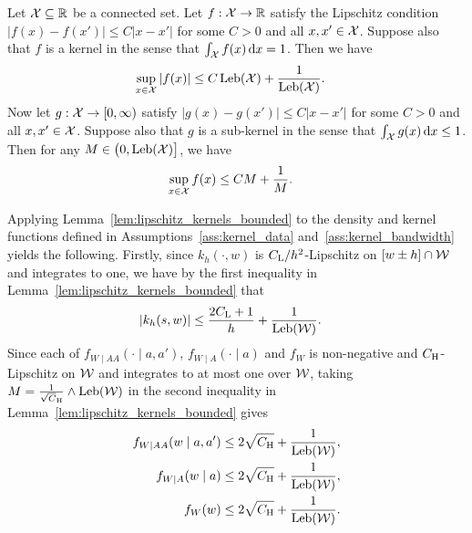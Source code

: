 \begin{lemma}
  \label{lem:lipschitz_kernels_bounded}

  Let $\mathcal{X} \subseteq \mathbb{R}$ be a connected set.
  Let $f: \mathcal{X} \to \mathbb{R}$ satisfy the Lipschitz condition
  $|f(x) - f(x')| \leq C |x-x'|$ for some $C > 0$
  and all $x, x' \in \mathcal{X}$.
  Suppose also that $f$ is a kernel in the sense that
  $\int_{\mathcal{X}} f(x) \,\mathrm{d}x = 1$.
  Then we have
  \begin{align*}
    \sup_{x \in \mathcal{X}} |f(x)|
    &\leq
    C \operatorname{Leb}(\mathcal{X}) + \frac{1}{\operatorname{Leb}(\mathcal{X})}.
  \end{align*}
  Now let $g: \mathcal{X} \to [0,\infty)$ satisfy
  $|g(x) - g(x')| \leq C |x-x'|$ for some $C > 0$
  and all $x, x' \in \mathcal{X}$.
  Suppose also that $g$ is a sub-kernel in the sense that
  $\int_{\mathcal{X}} g(x) \,\mathrm{d}x \leq 1$.
  Then for any $M \in \big(0, \operatorname{Leb}(\mathcal{X})\big]$,
  we have
  \begin{align*}
    \sup_{x \in \mathcal{X}} f(x)
    &\leq
    C M + \frac{1}{M}.
  \end{align*}

\end{lemma}

\begin{remark}

  Applying Lemma~\ref{lem:lipschitz_kernels_bounded}
  to the density and kernel functions defined in
  Assumptions~\ref{ass:kernel_data} and~\ref{ass:kernel_bandwidth}
  yields the following.
  Firstly, since $k_h(\cdot, w)$ is $C_\mathrm{L}/h^2$-Lipschitz
  on $[w \pm h] \cap \mathcal{W}$ and integrates to one,
  we have by the first inequality in
  Lemma~\ref{lem:lipschitz_kernels_bounded} that
  \begin{align*}
    |k_h(s,w)|
    &\leq \frac{2 C_\mathrm{L} + 1}{h} + \frac{1}{\operatorname{Leb}(\mathcal{W})}.
  \end{align*}
  Since each of
  $f_{W \mid AA}(\cdot \mid a,a')$,
  $f_{W \mid A}(\cdot \mid a)$ and
  $f_W$ is non-negative and $C_\mathrm{H}$-Lipschitz on $\mathcal{W}$
  and integrates to at most one over $\mathcal{W}$,
  taking $M = \frac{1}{\sqrt \CH} \wedge \Leb(\cW)$
  in the second inequality in
  Lemma~\ref{lem:lipschitz_kernels_bounded}
  gives
  \begin{align*}
    f_{W \mid AA}(w \mid a,a')
    &\leq 2 \sqrt{C_\mathrm{H}} + \frac{1}{\operatorname{Leb}(\mathcal{W})}, \\
    f_{W \mid A}(w \mid a)
    &\leq 2 \sqrt{C_\mathrm{H}} + \frac{1}{\operatorname{Leb}(\mathcal{W})}, \\
    f_W(w)
    &\leq 2 \sqrt{C_\mathrm{H}} + \frac{1}{\operatorname{Leb}(\mathcal{W})}.
  \end{align*}

\end{remark}

